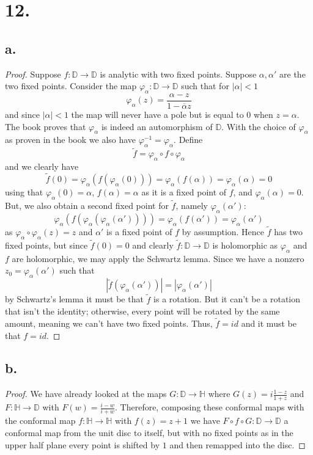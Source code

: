 \documentclass{article}
\begin{document}
\section*{12.}
\subsection*{a.}
\begin{proof}
  Suppose $f:\mathbb{D}\to \mathbb{D}$ is analytic with two fixed points. Suppose $\alpha, \alpha'$ are the two fixed points. Consider the map $\varphi_{\alpha}:\mathbb{D}\to \mathbb{D}$ such that for $|\alpha| < 1$
  \[
  \varphi_{\alpha}(z) = \frac{\alpha - z}{1 - \overline{\alpha}z}  
  \]
  and since $|\alpha| < 1$ the map will never have a pole but is equal to $0$ when $z = \alpha$. The book proves that $\varphi_{\alpha}$ is indeed an automorphism of $\mathbb{D}$. With the choice of $\varphi_{\alpha}$ as proven in the book we also have $\varphi_{\alpha}^{-1} = \varphi_{\alpha}$. Define 
  \[
  \tilde{f} = \varphi_{\alpha}\circ f \circ \varphi_{\alpha}  
  \]
  and we clearly have 
  \[
  \tilde{f}(0) = \varphi_{\alpha}(f(\varphi_{\alpha}(0))) = \varphi_{\alpha}(f(\alpha)) = \varphi_{\alpha}(\alpha) = 0  
  \]
  using that $\varphi_{\alpha}(0) = \alpha$, $f(\alpha) = \alpha$ as it is a fixed point of $f$, and $\varphi_{\alpha}(\alpha) = 0$. But, we also obtain a second fixed point for $\tilde{f}$, namely $\varphi_{\alpha}(\alpha')$:
  \[
  \varphi_{\alpha}(f(\varphi_{\alpha}(\varphi_{\alpha}(\alpha')))) = \varphi_{\alpha}(f(\alpha')) = \varphi_{\alpha}(\alpha')  
  \] as $\varphi_{\alpha}\circ\varphi_{\alpha}(z) = z$ and $\alpha'$ is a fixed point of $f$ by assumption. Hence $\tilde{f}$ has two fixed points, but since $\tilde{f}(0) = 0$ and clearly $\tilde{f}:\mathbb{D}\to \mathbb{D}$ is holomorphic as $\varphi_{\alpha}$ and $f$ are holomorphic, we may apply the Schwartz lemma. Since we have a nonzero $z_0 = \varphi_{\alpha}(\alpha')$ such that 
  \[
  |\tilde{f}(\varphi_{\alpha}(\alpha'))| = |\varphi_{\alpha}(\alpha')|  
  \]
  by Schwartz's lemma it must be that $\tilde{f}$ is a rotation. But it can't be a rotation that isn't the identity; otherwise, every point will be rotated by the same amount, meaning we can't have two fixed points. Thus, $\tilde{f} = id$ and it must be that $f = id$. 
\end{proof}

\subsection*{b.}
\begin{proof}
  We have already looked at the maps $G:\mathbb{D} \to \mathbb{H}$ where $G(z) = i \frac{1 - z}{1 + z}$ and $F:\mathbb{H}\to \mathbb{D}$ with $F(w) = \frac{i - w}{i + w}$. Therefore, composing these conformal maps with the conformal map $f:\mathbb{H} \to \mathbb{H}$ with $f(z) = z + 1$ we have $F\circ f\circ G: \mathbb{D} \to \mathbb{D}$ a conformal map from the unit disc to itself, but with no fixed points as in the upper half plane every point is shifted by $1$ and then remapped into the disc. 
\end{proof}
\end{document}
